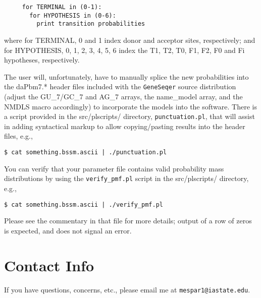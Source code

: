 \documentclass[11pt]{article}
\begin{document}
\begin{enumerate}
  \begin{verbatim}
     for TERMINAL in (0-1):
       for HYPOTHESIS in (0-6):
         print transition probabilities
  \end{verbatim}

  where for TERMINAL, 0 and 1 index donor and acceptor sites,
  respectively; and for HYPOTHESIS, 0, 1, 2, 3, 4, 5, 6 index the T1,
  T2, T0, F1, F2, F0 and Fi hypotheses, respectively.

  The user will, unfortunately, have to manually splice the new probabilities
  into the daPbm7.* header files included with the \texttt{GeneSeqer} source
  distribution (adjust the GU\_7/GC\_7 and AG\_7 arrays, the name\_model
  array, and the NMDLS macro accordingly) to incorporate the models
  into the software.  There is a script provided in the src/plscripts/ directory,
  \texttt{punctuation.pl}, that will assist in adding syntactical markup
  to allow copying/pasting results into the header files, e.g.,

  \begin{verbatim}
$ cat something.bssm.ascii | ./punctuation.pl
  \end{verbatim}
  You can verify that your parameter file contains valid probability
  mass distributions by using the \texttt{verify\_pmf.pl} script
  in the src/plscripts/ directory, e.g.,

  \begin{verbatim}
$ cat something.bssm.ascii | ./verify_pmf.pl
  \end{verbatim}
  Please see the commentary in that file for more details;
  output of a row of zeros is expected, and does not signal
  an error.
\end{enumerate}

\section{Contact Info}
If you have questions, concerns, etc.,
please email me at \texttt{mespar1@iastate.edu}.
\end{document}
